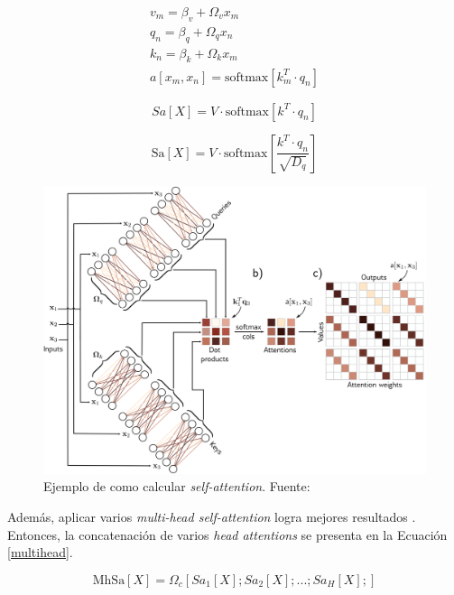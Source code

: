 \begin{equation}\label{eq:attention}
	\begin{gathered}
	v_m = \beta_v + \Omega_vx_m \\
	q_n = \beta_q + \Omega_qx_n \\
	k_n = \beta_k + \Omega_kx_m \\
	a[x_m, x_n] = \mbox{softmax}[k_m^T \cdot q_n]
	\end{gathered}
\end{equation}

\begin{equation}\label{eq:self-attention}
	Sa[X] = V \cdot \mbox{softmax}[ k^T \cdot q_n ]   
\end{equation}

\begin{equation}\label{eq:scaled-self-attention}
	\mbox{Sa}[X] = V \cdot \mbox{softmax}\left[ \frac{k^T \cdot q_n}{ \sqrt{D_q} }   \right]   
\end{equation}


\begin{figure}
	\centering
	\includegraphics[width=\textwidth]{../img/theory/t_1}
	\caption{Ejemplo de como calcular \textit{self-attention}. Fuente: \cite{prince2023understanding}}
	\label{fig:t_1}
\end{figure}

Además, aplicar varios \textit{multi-head self-attention} logra mejores resultados \citep{prince2023understanding}. Entonces, la concatenación de varios \textit{head attentions} se presenta en la Ecuación \ref{multihead}.

\begin{equation}\label{multihead}
	\mbox{MhSa}[X] = \Omega_c[Sa_1[X]; Sa_2[X];...;Sa_H[X];]
\end{equation}

